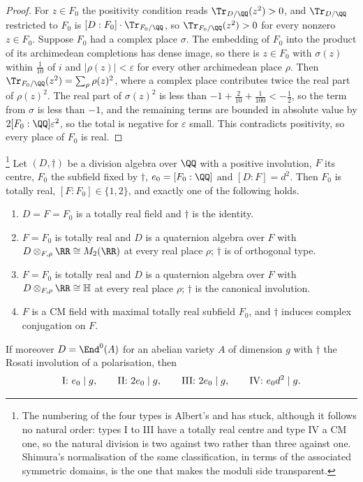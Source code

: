 \begin{proof}
For $z\in F_{0}$ the positivity condition reads
$\Tr_{D/\QQ}(z^{2})>0$, and $\Tr_{D/\QQ}$ restricted to $F_{0}$ is
$[D:F_{0}]\cdot\Tr_{F_{0}/\QQ}$, so $\Tr_{F_{0}/\QQ}(z^{2})>0$ for every
nonzero $z\in F_{0}$. Suppose $F_{0}$ had a complex place $\sigma$. The
embedding of $F_{0}$ into the product of its archimedean completions has dense
image, so there is $z\in F_{0}$ with $\sigma(z)$ within $\tfrac1{10}$ of $i$
and $|\rho(z)|<\varepsilon$ for every other archimedean place $\rho$. Then
$\Tr_{F_{0}/\QQ}(z^{2})=\sum_{\rho}\rho(z)^{2}$, where a complex place
contributes twice the real part of $\rho(z)^{2}$. The real part of
$\sigma(z)^{2}$ is less than $-1+\tfrac{2}{10}+\tfrac{1}{100}<-\tfrac12$, so
the term from $\sigma$ is less than $-1$, and the remaining terms are
bounded in absolute value by $2[F_{0}:\QQ]\varepsilon^{2}$, so the total is
negative for $\varepsilon$ small. This contradicts positivity, so every place
of $F_{0}$ is real.
\end{proof}

\begin{theorem}\label{thm:albert}%
\footnote{The numbering of the four types is Albert's and has stuck, although
it follows no natural order: types I to III have a totally real centre and
type IV a CM one, so the natural division is two against two rather than three
against one. Shimura's normalisation of the same classification, in terms of
the associated symmetric domains, is the one that makes the moduli side
transparent.}
Let $(D,\dagger)$ be a division algebra over $\QQ$ with a positive involution,
$F$ its centre, $F_{0}$ the subfield fixed by $\dagger$, $e_{0}=[F_{0}:\QQ]$
and $[D:F]=d^{2}$. Then $F_{0}$ is totally real, $[F:F_{0}]\in\{1,2\}$, and
exactly one of the following holds.
\begin{enumerate}[label=\textup{Type \Roman*.},leftmargin=4.2em,itemsep=2pt]
\item $D=F=F_{0}$ is a totally real field and $\dagger$ is the identity.
\item $F=F_{0}$ is totally real and $D$ is a quaternion algebra over $F$ with
  $D\otimes_{F,\rho}\RR\cong M_{2}(\RR)$ at every real place $\rho$;
  $\dagger$ is of orthogonal type.
\item $F=F_{0}$ is totally real and $D$ is a quaternion algebra over $F$ with
  $D\otimes_{F,\rho}\RR\cong\mathbb{H}$ at every real place $\rho$; $\dagger$
  is the canonical involution.
\item $F$ is a CM field with maximal totally real subfield $F_{0}$, and
  $\dagger$ induces complex conjugation on $F$.
\end{enumerate}
If moreover $D=\End^{0}(A)$ for an abelian variety $A$ of dimension $g$ with
$\dagger$ the Rosati involution of a polarisation, then
\[
  \text{\rm I: } e_{0}\mid g,
  \qquad
  \text{\rm II: } 2e_{0}\mid g,
  \qquad
  \text{\rm III: } 2e_{0}\mid g,
  \qquad
  \text{\rm IV: } e_{0}d^{2}\mid g .
\]
\end{theorem}

